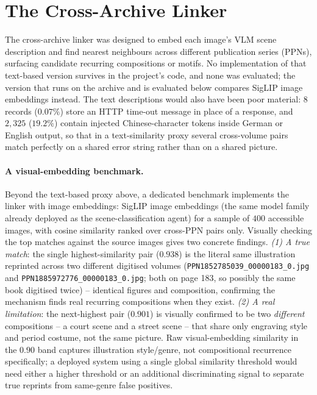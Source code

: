 \documentclass[12pt,a4paper]{report}
\begin{document}
\section{The Cross-Archive Linker}
\label{sec:agent4_linking}
The cross-archive linker was designed to embed each image's VLM scene description and find nearest neighbours across different publication series (PPNs), surfacing candidate recurring compositions or motifs. No implementation of that text-based version survives in the project's code, and none was evaluated; the version that runs on the archive and is evaluated below compares SigLIP image embeddings instead. The text descriptions would also have been poor material: $8$ records ($0.07\%$) store an HTTP time-out message in place of a response, and $2{,}325$ ($19.2\%$) contain injected Chinese-character tokens inside German or English output, so that in a text-similarity proxy several cross-volume pairs match perfectly on a shared error string rather than on a shared picture.

\paragraph{A visual-embedding benchmark.} Beyond the text-based proxy above, a dedicated benchmark implements the linker with image embeddings: SigLIP image embeddings (the same model family already deployed as the scene-classification agent) for a sample of $400$ accessible images, with cosine similarity ranked over cross-PPN pairs only. Visually checking the top matches against the source images gives two concrete findings. \emph{(1) A true match}: the single highest-similarity pair ($0.938$) is the literal same illustration reprinted across two different digitised volumes (\texttt{PPN1852785039\_00000183\_0.jpg} and \texttt{PPN1885972776\_00000183\_0.jpg}; both on page 183, so possibly the same book digitised twice) -- identical figures and composition, confirming the mechanism finds real recurring compositions when they exist. \emph{(2) A real limitation}: the next-highest pair ($0.901$) is visually confirmed to be two \emph{different} compositions -- a court scene and a street scene -- that share only engraving style and period costume, not the same picture. Raw visual-embedding similarity in the $0.90$ band captures illustration style/genre, not compositional recurrence specifically; a deployed system using a single global similarity threshold would need either a higher threshold or an additional discriminating signal to separate true reprints from same-genre false positives.
\end{document}
